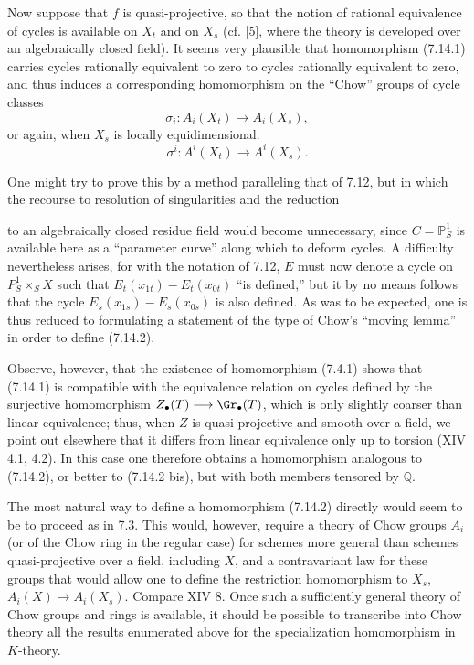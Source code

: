 Now suppose that \(f\) is quasi-projective, so that the notion of rational equivalence of cycles is available on \(X_t\) and on \(X_s\) (cf. [5], where the theory is developed over an algebraically closed field). It seems very plausible that homomorphism (7.14.1) carries cycles rationally equivalent to zero to cycles rationally equivalent to zero, and thus induces a corresponding homomorphism on the ``Chow'' groups of cycle classes
\begin{equation}\tag{7.14.2}
  \sigma_i:A_i(X_t)\longrightarrow A_i(X_s),
\end{equation}
or again, when \(X_s\) is locally equidimensional:
\begin{equation}\tag{7.14.2 bis}
  \sigma^i:A^i(X_t)\longrightarrow A^i(X_s).
\end{equation}

One might try to prove this by a method paralleling that of 7.12, but in which the recourse to resolution of singularities and the reduction

%
to an algebraically closed residue field would become unnecessary, since \(C=\mathbb P^1_S\) is available here as a ``parameter curve'' along which to deform cycles. A difficulty nevertheless arises, for with the notation of 7.12, \(E\) must now denote a cycle on \(P^1_S\times_SX\) such that \(E_t(x_{1t})-E_t(x_{0t})\) ``is defined,'' but it by no means follows that the cycle \(E_s(x_{1s})-E_s(x_{0s})\) is also defined. As was to be expected, one is thus reduced to formulating a statement of the type of Chow's ``moving lemma'' in order to define (7.14.2).

Observe, however, that the existence of homomorphism (7.4.1) shows that (7.14.1) is compatible with the equivalence relation on cycles defined by the surjective homomorphism \(Z_\bullet(T)\longrightarrow \Gr_\bullet(T)\), which is only slightly coarser than linear equivalence; thus, when \(Z\) is quasi-projective and smooth over a field, we point out elsewhere that it differs from linear equivalence only up to torsion (XIV 4.1, 4.2). In this case one therefore obtains a homomorphism analogous to (7.14.2), or better to (7.14.2 bis), but with both members tensored by \(\mathbb Q\).

The most natural way to define a homomorphism (7.14.2) directly would seem to be to proceed as in 7.3. This would, however, require a theory of Chow groups \(A_i\) (or of the Chow ring in the regular case) for schemes more general than schemes quasi-projective over a field, including \(X\), and a contravariant law for these groups that would allow one to define the restriction homomorphism to \(X_s\), \(A_i(X)\longrightarrow A_i(X_s)\). Compare XIV 8. Once such a sufficiently general theory of Chow groups and rings is available, it should be possible to transcribe into Chow theory all the results enumerated above for the specialization homomorphism in \(K\)-theory.

